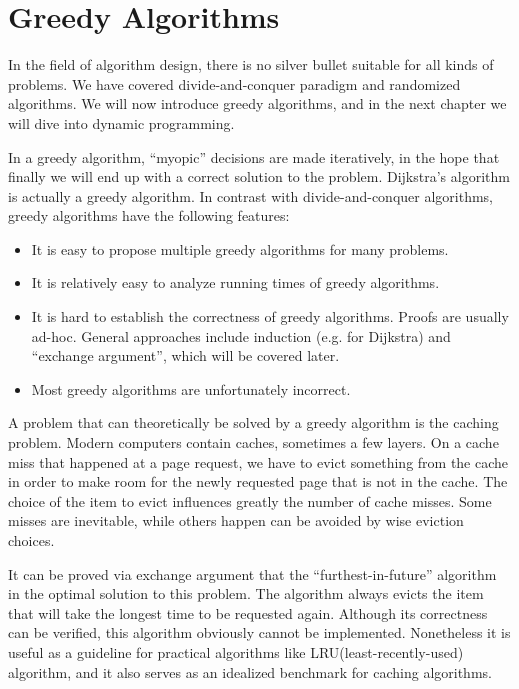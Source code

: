 \ifx\PREAMBLE\undefined




\fi
\chapter{Greedy Algorithms}
In the field of algorithm design, there is no silver bullet suitable for all kinds of problems. We have covered divide-and-conquer paradigm and randomized algorithms. We will now introduce greedy algorithms, and in the next chapter we will dive into dynamic programming.

In a greedy algorithm, ``myopic'' decisions are made iteratively, in the hope that finally we will end up with a correct solution to the problem. Dijkstra's algorithm is actually a greedy algorithm. In contrast with divide-and-conquer algorithms, greedy algorithms have the following features:
\begin{itemize}
\item It is easy to propose multiple greedy algorithms for many problems.
\item It is relatively easy to analyze running times of greedy algorithms.
\item It is hard to establish the correctness of greedy algorithms. Proofs are usually ad-hoc. General approaches include induction (e.g. for Dijkstra) and ``exchange argument'', which will be covered later.
\item Most greedy algorithms are unfortunately incorrect.
\end{itemize}

A problem that can theoretically be solved by a greedy algorithm is the caching problem. Modern computers contain caches, sometimes a few layers. On a cache miss that happened at a page request, we have to evict something from the cache in order to make room for the newly requested page that is not in the cache. The choice of the item to evict influences greatly the number of cache misses. Some misses are inevitable, while others happen can be avoided by wise eviction choices. 

It can be proved via exchange argument that the ``furthest-in-future'' algorithm in the optimal solution to this problem. The algorithm always evicts the item that will take the longest time to be requested again. Although its correctness can be verified, this algorithm obviously cannot be implemented. Nonetheless it is useful as a guideline for practical algorithms like LRU(least-recently-used) algorithm, and it also serves as an idealized benchmark for caching algorithms.
